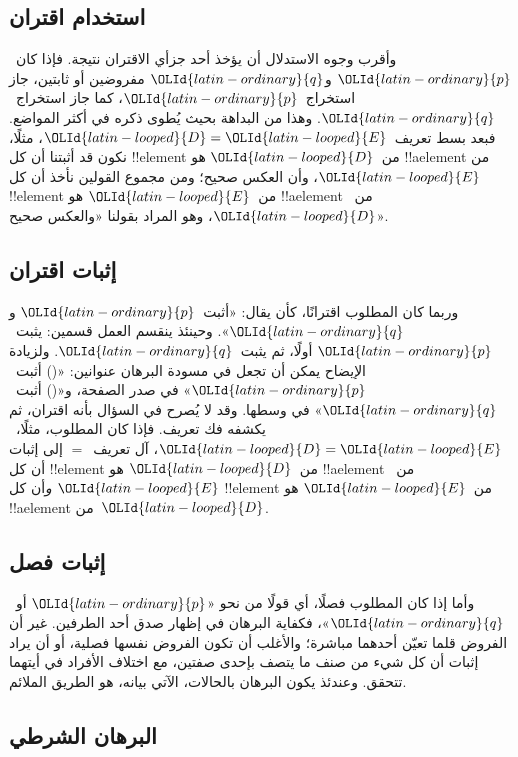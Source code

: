 \documentclass[../../../include/open-logic-section]{subfiles}
\begin{document}
\subsection{استخدام اقتران}

وأقرب وجوه الاستدلال أن يؤخذ أحد جزأي الاقتران نتيجة. فإذا كان~$\OLId{latin-ordinary}{p}$
و$\OLId{latin-ordinary}{q}$ مفروضين أو ثابتين، جاز استخراج~$\OLId{latin-ordinary}{p}$، كما جاز استخراج~$\OLId{latin-ordinary}{q}$. وهذا
من البداهة بحيث يُطوى ذكره في أكثر المواضع. فبعد بسط تعريف~$\OLId{latin-looped}{D} = \OLId{latin-looped}{E}$،
مثلًا، نكون قد أثبتنا أن كل !!{element} من~$\OLId{latin-looped}{D}$ هو !!a{element} من
$\OLId{latin-looped}{E}$، وأن العكس صحيح؛ ومن مجموع القولين نأخذ أن كل !!{element} من~$\OLId{latin-looped}{E}$
هو !!a{element} من~$\OLId{latin-looped}{D}$، وهو المراد بقولنا «والعكس صحيح».

\subsection{إثبات اقتران}

وربما كان المطلوب اقترانًا، كأن يقال: «أثبت~$\OLId{latin-ordinary}{p}$ و$\OLId{latin-ordinary}{q}$». وحينئذ ينقسم
العمل قسمين: يثبت~$\OLId{latin-ordinary}{p}$ أولًا، ثم يثبت~$\OLId{latin-ordinary}{q}$. ولزيادة الإيضاح يمكن أن
تجعل في مسودة البرهان عنوانين: «() أثبت~$\OLId{latin-ordinary}{p}$» في صدر الصفحة، و«()
أثبت~$\OLId{latin-ordinary}{q}$» في وسطها. وقد لا يُصرح في السؤال بأنه اقتران، ثم يكشفه فك
تعريف. فإذا كان المطلوب، مثلًا،~$\OLId{latin-looped}{D} = \OLId{latin-looped}{E}$، آل تعريف~$=$ إلى إثبات أن
كل !!{element} من~$\OLId{latin-looped}{D}$ هو !!a{element} من~$\OLId{latin-looped}{E}$ \emph{و}أن كل
!!{element} من~$\OLId{latin-looped}{E}$ هو !!a{element} من~$\OLId{latin-looped}{D}$.

\subsection{إثبات فصل}

وأما إذا كان المطلوب فصلًا، أي قولًا من نحو «$\OLId{latin-ordinary}{p}$ أو~$\OLId{latin-ordinary}{q}$»، فكفاية
البرهان في إظهار صدق أحد الطرفين. غير أن الفروض قلما تعيّن أحدهما
مباشرة؛ والأغلب أن تكون الفروض نفسها فصلية، أو أن يراد إثبات أن كل
شيء من صنف ما يتصف بإحدى صفتين، مع اختلاف الأفراد في أيتهما تتحقق.
وعندئذ يكون البرهان بالحالات، الآتي بيانه، هو الطريق الملائم.

\subsection{البرهان الشرطي}
\end{document}
